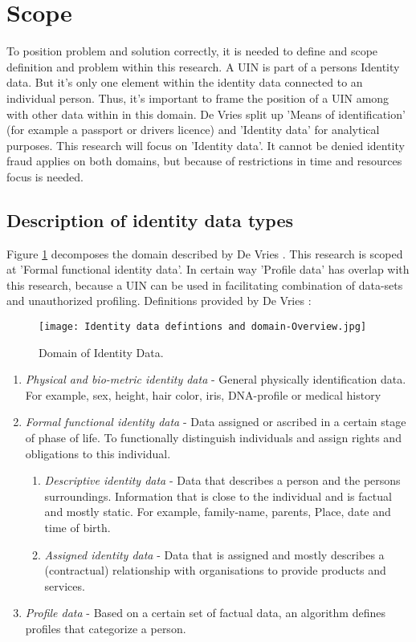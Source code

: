 \section{Scope}
To position problem and solution correctly, it is needed to define and scope definition and problem within this research. A UIN is part of a persons Identity data. But it's only one element within the identity data connected to an individual person. Thus, it's important to frame the position of a UIN among with other data within in this domain.
De Vries \etal \cite{Vries2007IdentiteitsfraudeEA} split up 'Means of identification' (for example a passport or drivers licence) and 'Identity data' for analytical purposes. This research will focus on 'Identity data'. It cannot be denied identity fraud applies on both domains, but because of restrictions in time and resources focus is needed. 

\subsection{Description of identity data types} \label{Identity_datatypes}
Figure \ref{fig:ID_domain} decomposes the domain described by De Vries \etal. This research is scoped at 'Formal functional identity data'. In certain way 'Profile data' has overlap with this research, because a UIN can be used in facilitating combination of data-sets and unauthorized profiling. Definitions provided by De Vries \etal: 
\graphicspath{ {./images/} }
\begin{figure}[t]
\texttt{[image: Identity data defintions and domain-Overview.jpg]}\\
\caption{Domain of Identity Data.}
\label{fig:ID_domain}
\end{figure}
\begin{enumerate}
\item \textit{Physical and bio-metric identity data} - General physically identification data. For example, sex, height, hair color, iris, DNA-profile or medical history
\item \textit{Formal functional identity data} - Data assigned or ascribed in a certain stage of phase of life. To functionally distinguish individuals and assign rights and obligations to this individual.
\begin{enumerate}
\item \textit{Descriptive identity data} - Data that describes a person and the persons surroundings. Information that is close to the individual and is factual and mostly static. For example, family-name, parents, Place, date and time of birth. 
\item \textit{Assigned identity data} - Data that is assigned and mostly describes a (contractual) relationship with organisations to provide products and services.
\end{enumerate}
\item \textit{Profile data} - Based on a certain set of factual data, an algorithm defines profiles that categorize a person. 
\end{enumerate}

